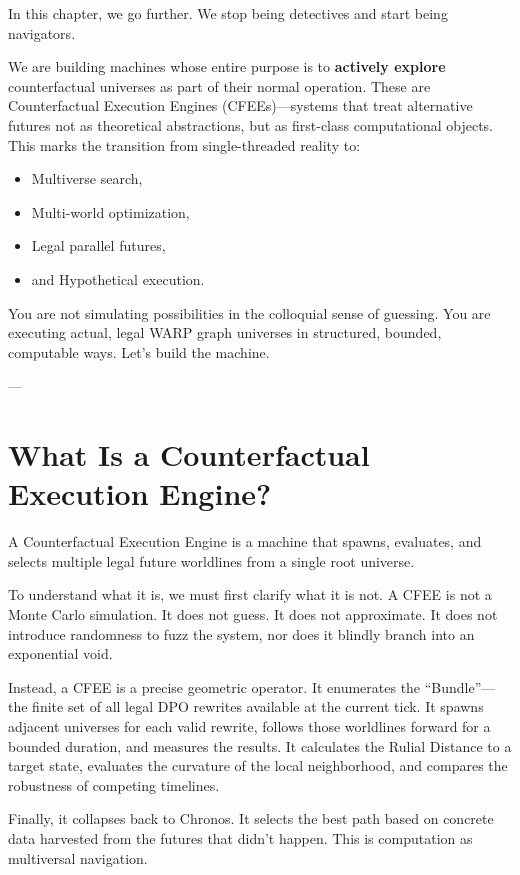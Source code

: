 In this chapter, we go further. We stop being detectives and start being navigators.

We are building machines whose entire purpose is to \textbf{actively explore} counterfactual universes as part of their normal operation. These are Counterfactual Execution Engines (CFEEs)—systems that treat alternative futures not as theoretical abstractions, but as first-class computational objects. This marks the transition from single-threaded reality to:

\begin{itemize}
    \item Multiverse search,
    \item Multi-world optimization,
    \item Legal parallel futures,
    \item and Hypothetical execution.
\end{itemize}

You are not simulating possibilities in the colloquial sense of guessing. You are executing actual, legal WARP graph universes in structured, bounded, computable ways. Let's build the machine.

---

\section{What Is a Counterfactual Execution Engine?}

A Counterfactual Execution Engine is a machine that spawns, evaluates, and selects multiple legal future worldlines from a single root universe.

To understand what it is, we must first clarify what it is not. A CFEE is not a Monte Carlo simulation. It does not guess. It does not approximate. It does not introduce randomness to fuzz the system, nor does it blindly branch into an exponential void.

Instead, a CFEE is a precise geometric operator. It enumerates the ``Bundle''—the finite set of all legal DPO rewrites available at the current tick. It spawns adjacent universes for each valid rewrite, follows those worldlines forward for a bounded duration, and measures the results. It calculates the Rulial Distance to a target state, evaluates the curvature of the local neighborhood, and compares the robustness of competing timelines.

Finally, it collapses back to Chronos. It selects the best path based on concrete data harvested from the futures that didn't happen. This is computation as multiversal navigation.

